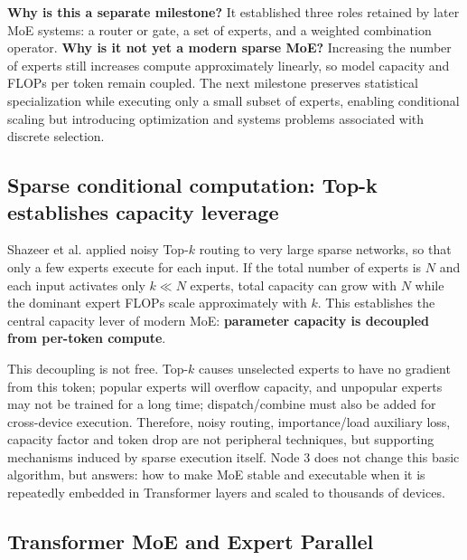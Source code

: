 \documentclass[10pt,a4paper,fontset=none]{ctexart}
\newcommand{\term}[1]{\textbf{#1}}
\begin{document}
\textbf{Why is this a separate milestone?} It established three roles retained by later MoE systems: a router or gate, a set of experts, and a weighted combination operator. \textbf{Why is it not yet a modern sparse MoE?} Increasing the number of experts still increases compute approximately linearly, so model capacity and FLOPs per token remain coupled. The next milestone preserves statistical specialization while executing only a small subset of experts, enabling conditional scaling but introducing optimization and systems problems associated with discrete selection.

\subsection{Sparse conditional computation: Top-k establishes capacity leverage}

Shazeer et al. applied noisy Top-$k$ routing to very large sparse networks\cite{en:shazeer2017outrageously}, so that only a few experts execute for each input. If the total number of experts is $N$ and each input activates only $k\ll N$ experts, total capacity can grow with $N$ while the dominant expert FLOPs scale approximately with $k$. This establishes the central capacity lever of modern MoE: \term{parameter capacity is decoupled from per-token compute}.

This decoupling is not free. Top-$k$ causes unselected experts to have no gradient from this token; popular experts will overflow capacity, and unpopular experts may not be trained for a long time; dispatch/combine must also be added for cross-device execution. Therefore, noisy routing, importance/load auxiliary loss, capacity factor and token drop are not peripheral techniques, but supporting mechanisms induced by sparse execution itself. Node 3 does not change this basic algorithm, but answers: how to make MoE stable and executable when it is repeatedly embedded in Transformer layers and scaled to thousands of devices.

\subsection{Transformer MoE and Expert Parallel}
\end{document}

